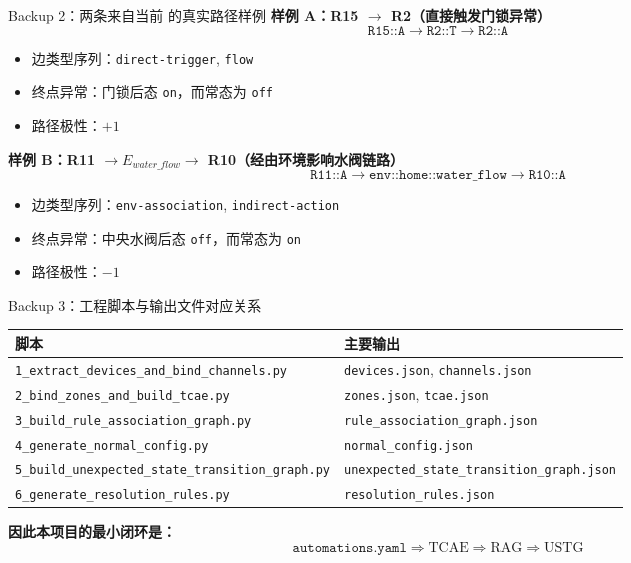 \documentclass[aspectratio=169,10pt]{beamer}
\newcommand{\RAG}{\text{RAG}}
\newcommand{\USTG}{\text{USTG}}
\newcommand{\TCAE}{\text{TCAE}}
\begin{document}
\begin{frame}{Backup 2：两条来自当前 \USTG 的真实路径样例}
\small
\textbf{样例 A：R15 $\rightarrow$ R2（直接触发门锁异常）}
\[
\texttt{R15::A} \rightarrow \texttt{R2::T} \rightarrow \texttt{R2::A}
\]
\begin{itemize}
  \item 边类型序列：\texttt{direct-trigger}, \texttt{flow}
  \item 终点异常：门锁后态 \texttt{on}，而常态为 \texttt{off}
  \item 路径极性：$+1$
\end{itemize}

\vspace{6pt}
\textbf{样例 B：R11 $\rightarrow E_{water\_flow} \rightarrow$ R10（经由环境影响水阀链路）}
\[
\texttt{R11::A} \rightarrow \texttt{env::home::water\_flow} \rightarrow \texttt{R10::A}
\]
\begin{itemize}
  \item 边类型序列：\texttt{env-association}, \texttt{indirect-action}
  \item 终点异常：中央水阀后态 \texttt{off}，而常态为 \texttt{on}
  \item 路径极性：$-1$
\end{itemize}
\end{frame}

\begin{frame}{Backup 3：工程脚本与输出文件对应关系}
\begin{center}
\tiny
\begin{tabular}{>{\RaggedRight\arraybackslash}p{} >{\RaggedRight\arraybackslash}p{}}
\toprule
脚本 & 主要输出 \\
\midrule
\texttt{1\_extract\_devices\_and\_bind\_channels.py} & \texttt{devices.json}, \texttt{channels.json} \\
\texttt{2\_bind\_zones\_and\_build\_tcae.py} & \texttt{zones.json}, \texttt{tcae.json} \\
\texttt{3\_build\_rule\_association\_graph.py} & \texttt{rule\_association\_graph.json} \\
\texttt{4\_generate\_normal\_config.py} & \texttt{normal\_config.json} \\
\texttt{5\_build\_unexpected\_state\_transition\_graph.py} & \texttt{unexpected\_state\_transition\_graph.json} \\
\texttt{6\_generate\_resolution\_rules.py} & \texttt{resolution\_rules.json} \\
\bottomrule
\end{tabular}
\end{center}

\vspace{6pt}
\textbf{因此本项目的最小闭环是：}
\[
\texttt{automations.yaml} \Rightarrow \TCAE \Rightarrow \RAG \Rightarrow \USTG
\]
\end{frame}
\end{document}
